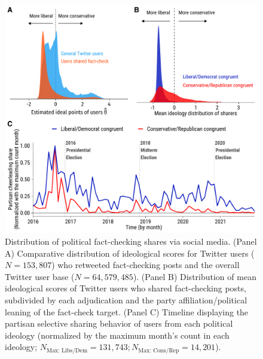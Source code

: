 \documentclass[
  12pt,
]{article}
\begin{document}
\begin{figure}[!ht]
\centering
    \includegraphics[width=\textwidth]{../fig/merged_fig2.pdf}
    \caption{Distribution of political fact-checking shares via social media. (Panel A) Comparative distribution of ideological scores for Twitter users ($N = 153,807$) who retweeted fact-checking posts and the overall Twitter user base ($N = 64,579,485$). (Panel B) Distribution of mean ideological scores of Twitter users who shared fact-checking posts, subdivided by each adjudication and the party affiliation/political leaning of the fact-check target. (Panel C) Timeline displaying the partisan selective sharing behavior of users from each political ideology (normalized by the maximum month's count in each ideology; $N_{\text{Max: Libs/Dem}} = 131,743; N_{\text{Max: Cons/Rep}} = 14,201$).}
    \label{fig:fig2}
\end{figure}

\newpage
\end{document}
